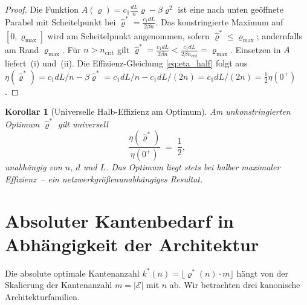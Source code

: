 \documentclass[12pt, a4paper, openany]{report}
\newtheorem{corollary}[theorem]{Korollar}
\newcommand{\calE}{\mathcal{E}}
\begin{document}
\begin{proof}
Die Funktion $A(\varrho) = c_1 \frac{dL}{n}\varrho - \beta\varrho^2$ ist eine
nach unten geöffnete Parabel mit Scheitelpunkt bei
$\hat\varrho^* = \frac{c_1 dL}{2\beta n}$.
Das konstringierte Maximum auf $[0, \varrho_{\max}]$ wird am Scheitelpunkt
angenommen, sofern $\hat\varrho^* \leq \varrho_{\max}$; andernfalls am Rand
$\varrho_{\max}$.  Für $n > n_{\mathrm{crit}}$ gilt
$\hat\varrho^* = \frac{c_1 dL}{2\beta n}
< \frac{c_1 dL}{2\beta n_{\mathrm{crit}}} = \varrho_{\max}$.
Einsetzen in $A$ liefert~(i) und~(ii).  Die Effizienz-Gleichung
\eqref{eq:eta_half} folgt aus $\eta(\hat\varrho^*) = c_1 dL/n
- \beta \hat\varrho^* = c_1 dL/n - c_1 dL/(2n) = c_1 dL/(2n)
= \tfrac{1}{2}\eta(0^+)$.
\end{proof}

\begin{corollary}[Universelle Halb-Effizienz am Optimum]
\label{cor:half_efficiency}
Am unkonstringierten Optimum $\hat\varrho^*$ gilt universell
\[
  \frac{\eta(\hat\varrho^*)}{\eta(0^+)} \;=\; \frac{1}{2},
\]
unabhängig von $n$, $d$ und $L$.  Das Optimum liegt stets bei halber
maximaler Effizienz~-- ein netzwerkgrößenunabhängiges Resultat.
\end{corollary}

\section{Absoluter Kantenbedarf in Abhängigkeit der Architektur}
\label{sec:scaling_arch}

Die absolute optimale Kantenanzahl $k^*(n) = \lfloor\varrho^*(n)\cdot m\rfloor$
hängt von der Skalierung der Kantenanzahl $m = |\calE|$ mit $n$ ab.  Wir
betrachten drei kanonische Architekturfamilien.
\end{document}
